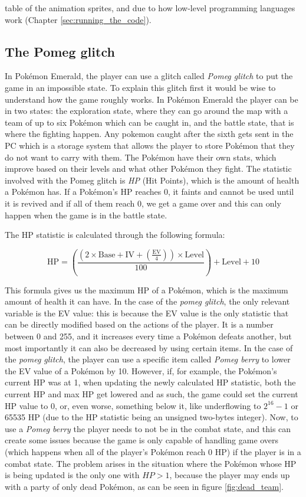 \documentclass[a4paper]{usiinfbachelorproject}
\begin{document}
table of the animation sprites, and due to how low-level programming languages work (Chapter \ref{sec:running_the_code}).

\subsection{\textbf{The Pomeg glitch}}
\label{sec:pomeg_glitch}
In Pokémon Emerald, the player can use a glitch called \textit{Pomeg glitch} to put the game in an impossible state. To explain this glitch first it would be wise to understand how the game roughly works. In Pokémon Emerald the player can be in two states: the exploration state, where they can go around the map with a team of up to six Pokémon which can be caught in, and the battle state, that is where the fighting happen. Any pokemon caught after the sixth gets sent in the PC which is a storage system that allows the player to store Pokémon that they do not want to carry with them. The Pokémon have their own stats, which improve based on their levels and what other Pokémon they fight. The statistic involved with the Pomeg glitch is \textit{HP} (Hit Points), which is the amount of health a Pokémon has. If a Pokémon's HP reaches 0, it faints and cannot be used until it is revived and if all of them reach 0, we get a game over and this can only happen when the game is in the battle state.

The HP statistic is calculated through the following formula:

\begin{equation}
	\text{HP} = \left( \frac{(2 \times \text{Base} + \text{IV} + \left( \frac{\text{EV}}{4} \right)) \times \text{Level}}{100} \right) + \text{Level} + 10
	\label{eq:ergodic_hypothesis}
\end{equation}

This formula gives us the maximum HP of a Pokémon, which is the maximum amount of health it can have. In the case of the \textit{pomeg glitch}, the only relevant variable is the EV value: this is because the EV value is the only statistic that can be directly modified based on the actions of the player. It is a number between 0 and 255, and it increases every time a Pokémon defeats another, but most importantly it can also be decreased by using certain items. In the case of the \textit{pomeg glitch}, the player can use a specific item called \textit{Pomeg berry} to lower the EV value of a Pokémon by 10. However, if, for example, the Pokémon's current HP was at 1, when updating the newly calculated HP statistic, both the current HP and max HP get lowered and as such, the game could set the current HP value to 0, or, even worse, something below it, like underflowing to $ 2^{16}-1$ or 65535 HP (due to the HP statistic being an unsigned two-bytes integer). Now, to use a \textit{Pomeg berry} the player needs to not be in the combat state, and this can create some issues because the game is only capable of handling game overs (which happens when all of the player's Pokémon reach 0 HP) if the player is in a combat state. The problem arises in the situation where the Pokémon whose HP is being updated is the only one with $HP > 1$, because the player may ends up with a party of only dead Pokémon, as can be seen in figure \ref{fig:dead_team}.
\end{document}
